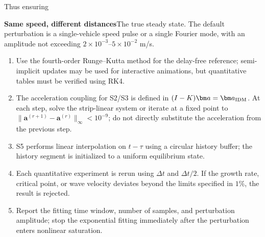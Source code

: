 \documentclass[11pt,a4paper,openany]{book}
\numberwithin{equation}{chapter}
\numberwithin{figure}{chapter}
\numberwithin{table}{chapter}
\begin{document}
Thus ensuring




\textbf{Same speed, different distances}The true steady state. The default perturbation is a single-vehicle speed pulse or a single Fourier mode, with an amplitude not exceeding $2\times10^{-3}$--$5\times10^{-2}$ m/s.










\begin{tcolorbox}[experimentbox,title=\textbf{Numerical Implementation Conventions}]
\begin{enumerate}[leftmargin=1.6em,itemsep=3pt]
\item




Use the fourth-order Runge–Kutta method for the delay-free reference; semi-implicit updates may be used for interactive animations, but quantitative tables must be verified using RK4.







\item




 The acceleration coupling for S2/S3 is defined in $(I-K)\bm a=\bm a_{\rm IDM}$. At each step, solve the strip-linear system or iterate at a fixed point to $\|\bm a^{(r+1)}-\bm a^{(r)}\|_\infty<10^{-9}$; do not directly substitute the acceleration from the previous step.







\item




 S5 performs linear interpolation on $t-\tau$ using a circular history buffer; the history segment is initialized to a uniform equilibrium state.







\item




Each quantitative experiment is rerun using $\Delta t$ and $\Delta t/2$. If the growth rate, critical point, or wave velocity deviates beyond the limits specified in $1\%$, the result is rejected.







\item




Report the fitting time window, number of samples, and perturbation amplitude; stop the exponential fitting immediately after the perturbation enters nonlinear saturation.







\end{enumerate}
\end{tcolorbox}
\end{document}
